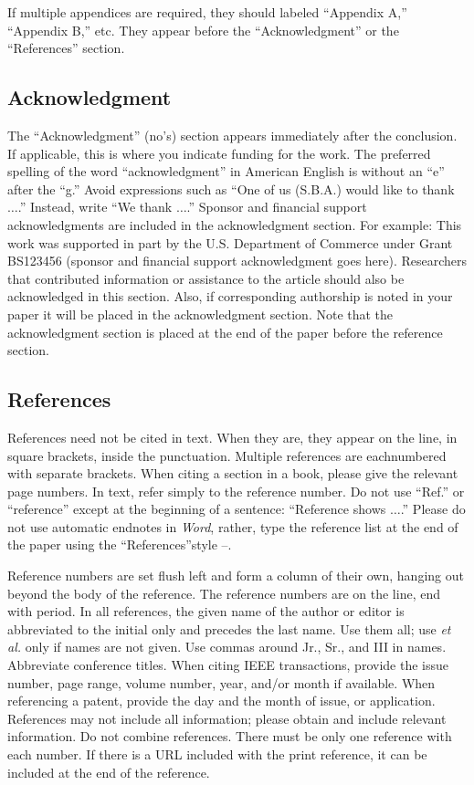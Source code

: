 \documentclass{IEEEmce}
\begin{document}
If multiple appendices are required, they should labeled ``Appendix A,'' ``Appendix B,'' etc. They appear before the ``Acknowledgment'' or the ``References'' section.

\subsection{Acknowledgment}

The ``Acknowledgment'' (no's) section appears immediately after the conclusion. If applicable, this is where you indicate funding for the work. The preferred spelling of the word ``acknowledgment'' in American English is without an ``e'' after the ``g.'' Avoid expressions such as ``One of us (S.B.A.) would like to thank $\ldots$.'' Instead, write ``We thank $\ldots$.'' Sponsor and financial support acknowledgments are included in the acknowledgment section. For example: This work was supported in part by the U.S. Department of Commerce under Grant BS123456 (sponsor and financial support acknowledgment goes here). Researchers that contributed information or assistance to the article should also be acknowledged in this section. Also, if corresponding authorship is noted in your paper it will be placed in the acknowledgment section. Note that the acknowledgment section is placed at the end of the paper before the reference section.

\subsection{References}

References need not be cited in text. When they are, they appear on the line, in square brackets, inside the punctuation. Multiple references are each\break numbered with separate brackets. When citing a section in a book, please give the relevant page numbers. In text, refer simply to the reference number. Do not use ``Ref.'' or ``reference'' except at the beginning of a sentence: ``Reference \cite{CC1} shows $\ldots$.'' Please do not use automatic endnotes in \emph{Word}, rather, type the reference list at the end of the paper using the ``References''\break style \cite{DD1}--\cite{II1}.

\enlargethispage{8pt}
Reference numbers are set flush left and form a column of their own, hanging out beyond the body of the reference. The reference numbers are on the line, end with period. In all references, the given name of the author or editor is abbreviated to the initial only and precedes the last name. Use them all; use \emph{et al.} only if names are not given. Use commas around Jr., Sr., and III in names. Abbreviate conference titles. When citing IEEE transactions, provide the issue number, page range, volume number, year, and/or month if available. When referencing a patent, provide the day and the month of issue, or application. References may not include all information; please obtain and include relevant information. Do not combine references. There must be only one reference with each number. If there is a URL included with the print reference, it can be included at the end of the reference.
\end{document}
